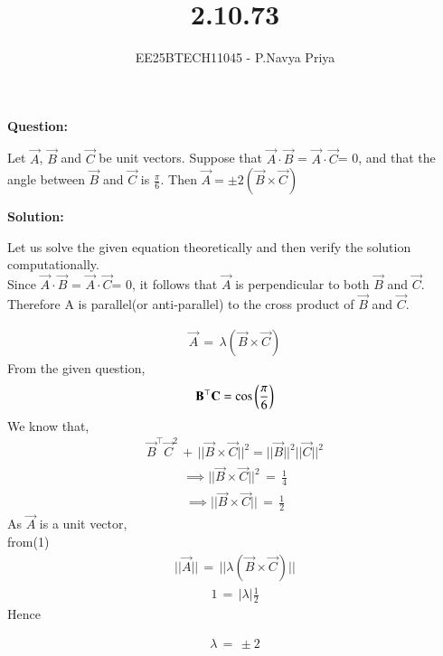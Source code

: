 \documentclass[journal,12pt,onecolumn]{IEEEtran}
\theoremstyle{remark}
\begin{document}
\title{2.10.73}
\author{EE25BTECH11045 - P.Navya Priya}
\maketitle
\renewcommand{\thefigure}{\theenumi}
\renewcommand{\thetable}{\theenumi}

\textbf{Question:}

 Let $\vec{A}$, $\vec{B}$ and $\vec{C}$ be unit vectors. Suppose that  $\vec{A}\cdot\vec{B}$ =  $\vec{A}\cdot\vec{C}$= 0, and that the angle between  $\vec{B}$ and  $\vec{C}$ is $\frac{\pi}{6}$. Then $\vec{A}= \pm2(\vec{B}\times\vec{C})$
 \vspace{0.5cm}

\textbf{Solution:}

Let us solve the given equation theoretically and then verify the solution computationally.\\

Since $\vec{A}\cdot\vec{B}$ =  $\vec{A}\cdot\vec{C}$= 0, it follows that $\vec{A}$ is perpendicular to both $\vec{B}$ and $\vec{C}$. Therefore A is parallel(or anti-parallel) to the cross product of $\vec{B}$ and $\vec{C}$.

\begin{align}
    \vec{A}\,=\,\lambda(\vec{B}\times\vec{C})
\end{align}
From the given question,
\begin{align}
    \mathbf{B}^\top\mathbf{C}=\text{cos}\left(\frac{\pi}{6}\right)
\end{align}
We know that,
\begin{align}
 \vec{B}^\top\vec{C}^{2}\,+\,||\vec{B}\times\vec{C}||^{2}=||\vec{B}||^{2}||\vec{C}||^{2}
\end{align}
\begin{align}
 \implies   ||\vec{B}\times\vec{C}||^{2}\,=\,\frac{1}{4}
\end{align}
\begin{align}
   \implies   ||\vec{B}\times\vec{C}||\,=\,\frac{1}{2}
\end{align}
As $\vec{A}$ is a unit vector,\\
from(1)
\begin{align}
    ||\vec{A}||\,=\,||\lambda(\vec{B}\times\vec{C})||
\end{align}
\begin{align}
    1\,=\,|\lambda|\frac{1}{2}
\end{align}
Hence

\begin{align}
 \lambda\,=\,\pm 2
\end{align}
\end{document}
